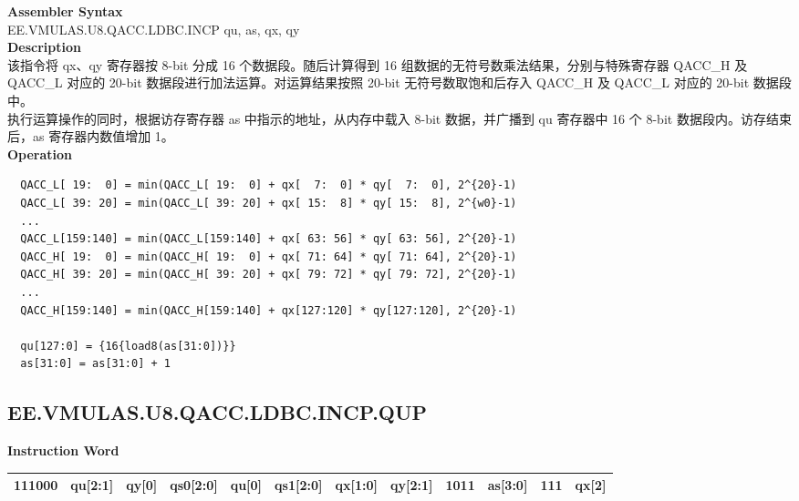 \textbf{Assembler Syntax} \\
EE.VMULAS.U8.QACC.LDBC.INCP qu, as, qx, qy \\
\textbf{Description} \\
该指令将 qx、qy 寄存器按 8-bit 分成 16 个数据段。随后计算得到 16 组数据的无符号数乘法结果，分别与特殊寄存器 QACC\_H 及 QACC\_L 对应的 20-bit 数据段进行加法运算。对运算结果按照 20-bit 无符号数取饱和后存入 QACC\_H 及 QACC\_L 对应的 20-bit 数据段中。\\
执行运算操作的同时，根据访存寄存器 as 中指示的地址，从内存中载入 8-bit 数据，并广播到 qu 寄存器中 16 个 8-bit 数据段内。访存结束后，as 寄存器内数值增加 1。\\
\textbf{Operation}
\begin{lstlisting}
  QACC_L[ 19:  0] = min(QACC_L[ 19:  0] + qx[  7:  0] * qy[  7:  0], 2^{20}-1)
  QACC_L[ 39: 20] = min(QACC_L[ 39: 20] + qx[ 15:  8] * qy[ 15:  8], 2^{w0}-1)
  ...
  QACC_L[159:140] = min(QACC_L[159:140] + qx[ 63: 56] * qy[ 63: 56], 2^{20}-1)
  QACC_H[ 19:  0] = min(QACC_H[ 19:  0] + qx[ 71: 64] * qy[ 71: 64], 2^{20}-1)
  QACC_H[ 39: 20] = min(QACC_H[ 39: 20] + qx[ 79: 72] * qy[ 79: 72], 2^{20}-1)
  ...
  QACC_H[159:140] = min(QACC_H[159:140] + qx[127:120] * qy[127:120], 2^{20}-1)

  qu[127:0] = {16{load8(as[31:0])}}
  as[31:0] = as[31:0] + 1
\end{lstlisting}

\clearpage
\subsection{EE.VMULAS.U8.QACC.LDBC.INCP.QUP}\label{instruction:EEVMULASU8QACCLDBCINCPQUP}
\setlength\tabcolsep{6pt}
\textbf{Instruction Word} \\
\begin{tabular}{|c|c|c|c|c|c|c|c|c|c|c|c|}
	\hline
	111000 & qu[2:1] & qy[0] & qs0[2:0] & qu[0] & qs1[2:0] & qx[1:0] & qy[2:1] & 1011 & as[3:0] & 111 & qx[2] \\
	\hline
\end{tabular}

